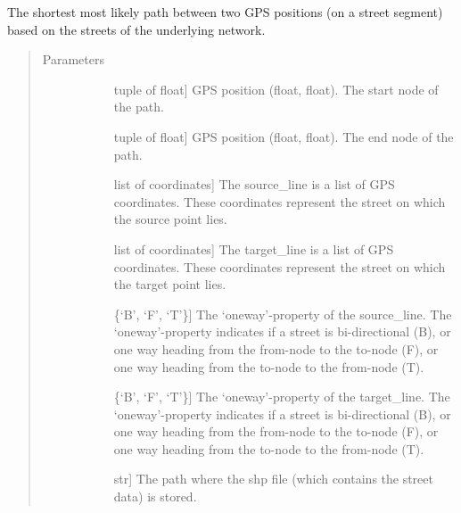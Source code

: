 \documentclass[letterpaper,10pt,english]{sphinxmanual}
\begin{document}
\begin{fulllineitems}
\label{\detokenize{index:gps2net.getShortestPathAStar}}
The shortest \textendash{} most likely \textendash{} path between two GPS positions (on a street segment) based on the streets of the underlying network.
\begin{quote}\begin{description}
\item[{Parameters}] \leavevmode\begin{description}
\item[{}] \leavevmode{[}tuple of float{]}
GPS position (float, float). The start node of the path.

\item[{}] \leavevmode{[}tuple of float{]}
GPS position (float, float). The end node of the path.

\item[{}] \leavevmode{[}list of coordinates{]}
The source\_line is a list of GPS coordinates. These coordinates represent the street on which the source point lies.

\item[{}] \leavevmode{[}list of coordinates{]}
The target\_line is a list of GPS coordinates. These coordinates represent the street on which the target point lies.

\item[{}] \leavevmode{[}\{‘B’, ‘F’, ‘T’\}{]}
The ‘oneway’-property of the source\_line.
The ‘oneway’-property indicates if a street is bi-directional (B), or one way heading from the from-node to the to-node (F), or one way heading from the to-node to the from-node (T).

\item[{}] \leavevmode{[}\{‘B’, ‘F’, ‘T’\}{]}
The ‘oneway’-property of the target\_line.
The ‘oneway’-property indicates if a street is bi-directional (B), or one way heading from the from-node to the to-node (F), or one way heading from the to-node to the from-node (T).

\item[{}] \leavevmode{[}str{]}
The path where the shp file (which contains the street data) is stored.


\end{description}
\end{description}
\end{quote}
\end{fulllineitems}
\end{document}
